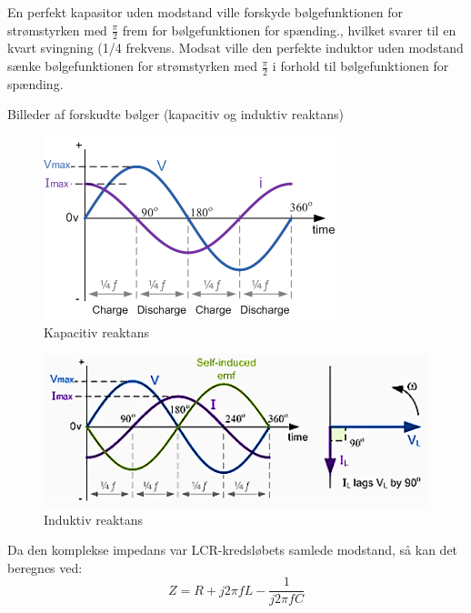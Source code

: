 En perfekt kapasitor uden modstand ville forskyde bølgefunktionen for strømstyrken med $\frac{\pi}{2}$ frem for bølgefunktionen for spænding., hvilket svarer til en kvart svingning (1/4 frekvens. Modsat ville den perfekte induktor uden modstand sænke bølgefunktionen for strømstyrken med $\frac{\pi}{2}$ i forhold til bølgefunktionen for spænding.

Billeder af forskudte bølger (kapacitiv og induktiv reaktans)
\begin{figure}[H]
\centering
\includegraphics[scale=1]{Vildledning/Schematics/Kapacitiv_reaktans}
\caption{Kapacitiv reaktans}
\label{kreaktans}
\end{figure}

\begin{figure}[H]
\centering
\includegraphics[scale=0.8]{Vildledning/Schematics/Induktiv_reaktans}
\caption{Induktiv reaktans}
\label{ireaktans}
\end{figure}

Da den komplekse impedans var LCR-kredsløbets samlede modstand, så kan det beregnes ved:
\begin{equation}
Z = R + j 2 \pi f L - \frac{1}{j 2 \pi f C}
\end{equation}
\newpage